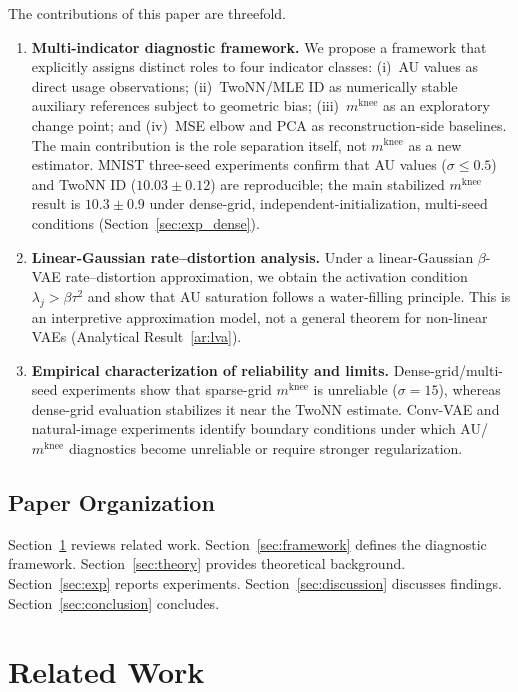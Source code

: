 \documentclass[make,article,submit,pdftex,moreauthors]{Definitions/mdpi}
\newcommand{\mknee}{m^{\mathrm{knee}}}
\begin{document}
The contributions of this paper are threefold.
\begin{enumerate}
\item \textbf{Multi-indicator diagnostic framework.}
We propose a framework that explicitly assigns distinct roles to four
indicator classes: (i)~AU values as direct usage observations;
(ii)~TwoNN/MLE ID as numerically stable auxiliary references subject to
geometric bias; (iii)~$\mknee$ as an exploratory change point; and
(iv)~MSE elbow and PCA as reconstruction-side baselines.
The main contribution is the role separation itself, not $\mknee$ as a new
estimator.
MNIST three-seed experiments confirm that AU values ($\sigma \leq 0.5$) and
TwoNN ID ($10.03 \pm 0.12$) are reproducible; the main stabilized $\mknee$
result is $10.3 \pm 0.9$ under dense-grid, independent-initialization,
multi-seed conditions (Section~\ref{sec:exp_dense}).

\item \textbf{Linear-Gaussian rate--distortion analysis.}
Under a linear-Gaussian $\beta$-VAE rate--distortion approximation, we
obtain the activation condition $\lambda_j > \beta\tau^2$ and show that
AU saturation follows a water-filling principle.
This is an interpretive approximation model, not a general theorem for
non-linear VAEs (Analytical Result~\ref{ar:lva}).

\item \textbf{Empirical characterization of reliability and limits.}
Dense-grid/multi-seed experiments show that sparse-grid $\mknee$ is
unreliable ($\sigma = 15$), whereas dense-grid evaluation stabilizes it near
the TwoNN estimate.
Conv-VAE and natural-image experiments identify boundary conditions under
which AU/$\mknee$ diagnostics become unreliable or require stronger
regularization.
\end{enumerate}

\subsection{Paper Organization}

Section~\ref{sec:related} reviews related work.
Section~\ref{sec:framework} defines the diagnostic framework.
Section~\ref{sec:theory} provides theoretical background.
Section~\ref{sec:exp} reports experiments.
Section~\ref{sec:discussion} discusses findings.
Section~\ref{sec:conclusion} concludes.

\section{Related Work}\label{sec:related}
\end{document}
